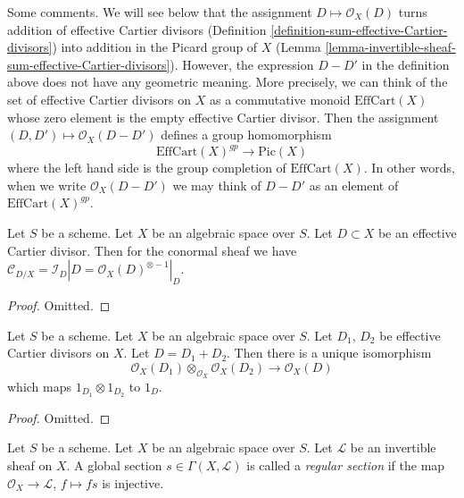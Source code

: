 \noindent
Some comments. We will see below that the assignment
$D \mapsto \mathcal{O}_X(D)$ turns addition of effective Cartier
divisors (Definition \ref{definition-sum-effective-Cartier-divisors})
into addition in the Picard group of $X$
(Lemma \ref{lemma-invertible-sheaf-sum-effective-Cartier-divisors}).
However, the expression $D - D'$ in the definition above does not
have any geometric meaning. More precisely, we can think of the
set of effective Cartier divisors on $X$ as a commutative monoid
$\text{EffCart}(X)$ whose zero element is the empty effective Cartier divisor.
Then the assignment $(D, D') \mapsto \mathcal{O}_X(D - D')$ defines
a group homomorphism
$$
\text{EffCart}(X)^{gp} \longrightarrow \text{Pic}(X)
$$
where the left hand side is the group completion of
$\text{EffCart}(X)$. In other words, when we write $\mathcal{O}_X(D - D')$
we may think of $D - D'$ as an element of $\text{EffCart}(X)^{gp}$.

\begin{lemma}
\label{lemma-conormal-effective-Cartier-divisor}
Let $S$ be a scheme. Let $X$ be an algebraic space over $S$.
Let $D \subset X$ be an effective Cartier divisor.
Then for the conormal sheaf we have $\mathcal{C}_{D/X} = \mathcal{I}_D|D =
\mathcal{O}_X(D)^{\otimes -1}|_D$.
\end{lemma}

\begin{proof}
Omitted.
\end{proof}

\begin{lemma}
\label{lemma-invertible-sheaf-sum-effective-Cartier-divisors}
Let $S$ be a scheme. Let $X$ be an algebraic space over $S$.
Let $D_1$, $D_2$ be effective Cartier divisors on $X$.
Let $D = D_1 + D_2$.
Then there is a unique isomorphism
$$
\mathcal{O}_X(D_1) \otimes_{\mathcal{O}_X} \mathcal{O}_X(D_2)
\longrightarrow
\mathcal{O}_X(D)
$$
which maps $1_{D_1} \otimes 1_{D_2}$ to $1_D$.
\end{lemma}

\begin{proof}
Omitted.
\end{proof}

\begin{definition}
\label{definition-regular-section}
Let $S$ be a scheme. Let $X$ be an algebraic space over $S$.
Let $\mathcal{L}$ be an invertible sheaf on $X$.
A global section $s \in \Gamma(X, \mathcal{L})$ is called a
{\it regular section} if the map $\mathcal{O}_X \to \mathcal{L}$,
$f \mapsto fs$ is injective.
\end{definition}

